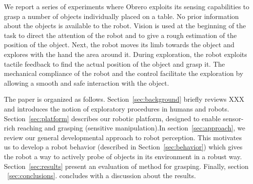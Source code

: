 We report a series of experiments where Obrero exploits its
sensing capabilities to grasp a number of objects individually
placed on a table. No prior information about the objects is
available to the robot. Vision is used at the beginning of the
task to direct the attention of the robot and to give a rough
estimation of the position of the object. Next, the robot moves
its limb towards the object and explores with the hand the area
around it. During exploration, the robot exploits tactile feedback
to find the actual position of the object and grasp it. The
mechanical compliance of the robot and the control facilitate the
exploration by allowing a smooth and safe interaction with the
object.

The paper is organized as follows. Section~\ref{sec:background}
briefly reviews XXX and introduces the notion of exploratory
procedures in humans and robots. Section~\ref{sec:platform}
describes our robotic platform, designed to enable sensor-rich
reaching and grasping (sensitive manipulation).In
section~\ref{sec:approach}, we review our general developmental
approach to robot perception. This motivates us to develop a robot
behavior (described in Section~\ref{sec:behavior}) which gives the
robot a way to actively probe of objects in its environment in a
robust way. Section~\ref{sec:results} present an evaluation of
method for grasping. Finally, section ~\ref{sec:conclusions}.
concludes with a discussion about the results.








